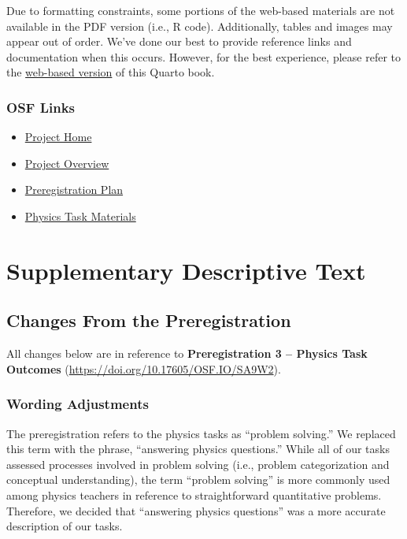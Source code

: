 \documentclass[
  letterpaper,
  DIV=11,
  numbers=noendperiod]{scrreprt}
\providecommand{\tightlist}{%
  \setlength{\itemsep}{0pt}\setlength{\parskip}{0pt}}
\begin{document}

Due to formatting constraints, some portions of the web-based materials
are not available in the PDF version (i.e., R code). Additionally,
tables and images may appear out of order. We've done our best to
provide reference links and documentation when this occurs. However, for
the best experience, please refer to the
\href{https://apelakh.github.io/pelakh-et-al-2025-supplement/}{web-based
version} of this Quarto book.

\section*{OSF Links}\label{osf-links}


\begin{itemize}
\tightlist
\item
  \href{https://doi.org/10.17605/OSF.IO/WV6XT}{Project Home}
\item
  \href{https://doi.org/10.17605/OSF.IO/7RXVC}{Project Overview}
\item
  \href{https://doi.org/10.17605/OSF.IO/SA9W2}{Preregistration Plan}
\item
  \href{https://osf.io/fm8qx/}{Physics Task Materials}
\end{itemize}

\part{Supplementary Descriptive Text}

\chapter{Changes From the
Preregistration}\label{changes-from-the-preregistration}

All changes below are in reference to \textbf{Preregistration 3 --
Physics Task Outcomes} (\url{https://doi.org/10.17605/OSF.IO/SA9W2}).

\section{Wording Adjustments}\label{wording-adjustments}

The preregistration refers to the physics tasks as ``problem solving.''
We replaced this term with the phrase, ``answering physics questions.''
While all of our tasks assessed processes involved in problem solving
(i.e., problem categorization and conceptual understanding), the term
``problem solving'' is more commonly used among physics teachers in
reference to straightforward quantitative problems. Therefore, we
decided that ``answering physics questions'' was a more accurate
description of our tasks.
\end{document}
